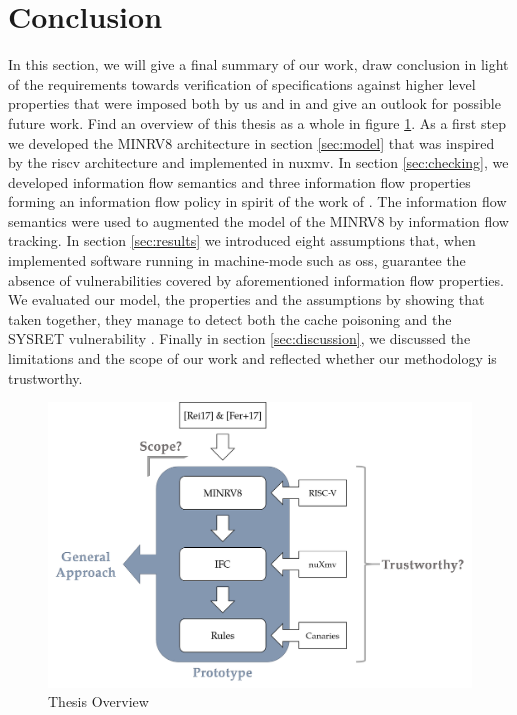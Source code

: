 
\section{Conclusion}
\label{sec:conclusion}

In this section, we will give a final summary of our work, draw conclusion in light of the requirements towards verification of specifications against higher level properties that were imposed both by us and \citeauthor{Reid17} in \cite{Reid17} and give an outlook for possible future work.
Find an overview of this thesis as a whole in figure \ref{fig:overview}.
As a first step we developed the MINRV8 architecture in section \ref{sec:model} that was inspired by the \gls{riscv} architecture and implemented in \gls{nuxmv}.
In section \ref{sec:checking}, we developed information flow semantics and three information flow properties forming an information flow policy in spirit of the work of \citeauthor{Ferraiuolo17} \cite{Ferraiuolo17}.
The information flow semantics were used to augmented the model of the MINRV8 by information flow tracking.
In section \ref{sec:results} we introduced eight assumptions that, when implemented software running in machine-mode such as \glspl{os}, guarantee the absence of vulnerabilities covered by aforementioned information flow properties.
We evaluated our model, the properties and the assumptions by showing that taken together, they manage to detect both the cache poisoning \cite{Wojtczuk09} and the SYSRET vulnerability \cite{Dunlap19}.
Finally in section \ref{sec:discussion}, we discussed the limitations and the scope of our work and reflected whether our methodology is trustworthy.

\begin{figure}
    \centering
    \includegraphics[width=\textwidth]{figures/thesis-overview.png}
    \caption{Thesis Overview}
    \label{fig:overview}
\end{figure}

